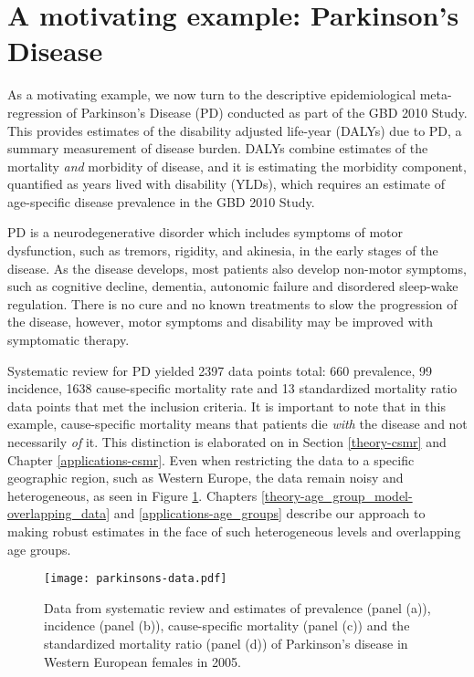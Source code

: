 \section{A motivating example: Parkinson's Disease}
\label{intro-complete_ex}

As a motivating example, we now turn to the descriptive epidemiological meta-regression of Parkinson's Disease (PD) conducted as part of the GBD 2010 Study.  This provides estimates of the disability adjusted life-year (DALYs) due to PD, a summary measurement of disease burden.  DALYs combine estimates of the mortality \emph{and} morbidity of disease, and it is estimating the morbidity component, quantified as years lived with disability (YLDs), which requires an estimate of age-specific disease prevalence in the GBD 2010 Study.

PD is a neurodegenerative disorder which includes symptoms of motor dysfunction, such as tremors, rigidity, and akinesia, in the early stages of the disease.  As the disease develops, most patients also develop non-motor symptoms, such as cognitive decline, dementia, autonomic failure and disordered sleep-wake regulation.  There is no cure and no known treatments to slow the progression of the disease, however, motor symptoms and disability may be improved with symptomatic therapy.\cite{poewe_natural_2006, pollock_prevalence_1966}

Systematic review for PD yielded 2397 data points total: 660 prevalence, 99 incidence, 1638 cause-specific mortality rate and 13 standardized mortality ratio data points that met the inclusion criteria.  It is important to note that in this example, cause-specific mortality means that patients die \emph{with} the disease and not necessarily \emph{of} it.  This distinction is elaborated on in Section \ref{theory-csmr} and Chapter \ref{applications-csmr}.  Even when restricting the data to a specific geographic region, such as Western Europe, the data remain noisy and heterogeneous, as seen in Figure \ref{fig:intro-parkinsons data}. Chapters \ref{theory-age_group_model-overlapping_data} and \ref{applications-age_groups} describe our approach to making robust estimates in the face of such heterogeneous levels and overlapping age groups.

    \begin{figure}[h]
        \begin{center}
            \texttt{[image: parkinsons-data.pdf]}
            \caption{Data from systematic review and estimates of prevalence (panel (a)), incidence (panel (b)), cause-specific mortality (panel (c)) and the standardized mortality ratio (panel (d)) of Parkinson's disease in Western European females in 2005.}
            \label{fig:intro-parkinsons data}
        \end{center}
    \end{figure}

